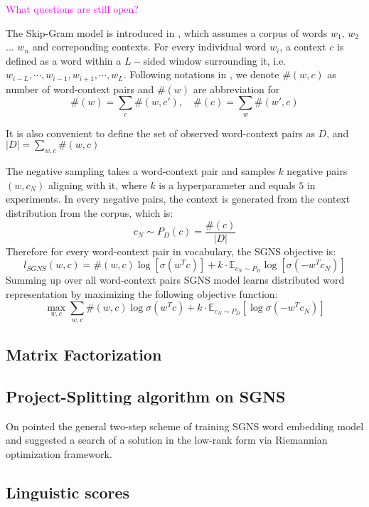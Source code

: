 \documentclass[letterpaper]{article} %
\begin{document}
\textcolor{magenta}{What questions are still open?}

The Skip-Gram model is introduced in \cite{NIPS2013_5021}, which assumes a corpus of words $w_1$, $w_2$ ... $w_n$ and correponding contexts. For every individual word $w_i$, a context $c$ is defined as a word within a $L-$sided window surrounding it, i.e. $w_{i−L},\cdots, w_{i−1},w_{i+1},\cdots,w_L$. Following notations in \cite{levy2014neural}, we denote $\#(w,c)$ as number of word-context pairs and $\#(w)$ are abbreviation for
\begin{equation}
\#(w)=\sum_c\#(w,c'),\quad\#(c)=\sum_w\#(w',c)	
\end{equation}

It is also convenient to define the set of observed word-context pairs as $D$, and $|D|=\sum_{w,c}\#(w,c)$


The negative sampling takes a word-context pair and samples $k$ negative pairs $(w,c_N)$ aligning with it, where $k$ is a hyperparameter and equals $5$ in experiments. In every negative pairs, the context is generated from the context distribution from the corpus, which is:
\begin{equation}
	c_N\sim P_D(c)=\frac{\#(c)}{|D|}
\end{equation}
Therefore for every word-context pair in vocabulary, the SGNS objective is:
\begin{equation}
	l_{SGNS}(w,c)= \#(w,c)\log[\sigma(w^Tc)]+k\cdot\mathbb{E}_{c_N\sim P_D}\log[\sigma(-w^Tc_N)]
\end{equation}
Summing up over all word-context pairs SGNS model learns distributed word representation by maximizing the following objective function:
\begin{equation}
	\max_{w,c} \sum_{w,c}\#(w,c)\log\sigma(w^Tc)+k\cdot\mathbb{E}_{c_N\sim P_D}[\log \sigma(-w^Tc_N)] \label{eq: original SGNS}
\end{equation}
\subsection{Matrix Factorization}
\subsection{Project-Splitting algorithm on SGNS}
On \cite{fonarev2017riemannian} pointed the general two-step scheme of training SGNS word embedding model and suggested a search of a solution in the low-rank form via Riemannian optimization framework.
\subsection{Linguistic scores}
\end{document}
